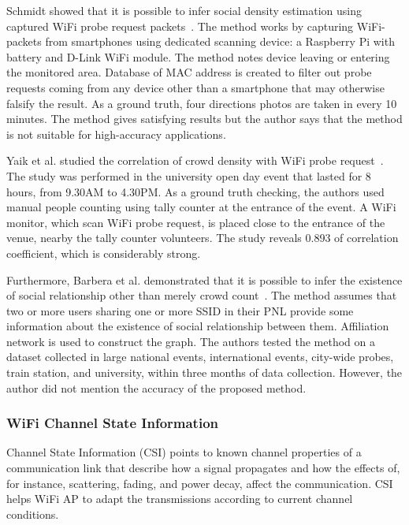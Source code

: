 	Schmidt showed that it is possible to infer social density estimation using captured WiFi probe request packets~\cite{thesis057}. The method works by capturing WiFi-packets from smartphones using dedicated scanning device: a Raspberry Pi with battery and D-Link WiFi module. The method notes device leaving or entering the monitored area. Database of \ac{MAC} address is created to filter out probe requests coming from any device other than a smartphone that may otherwise falsify the result. As a ground truth, four directions photos are taken in every 10 minutes. The method gives satisfying results but the author says that the method is not suitable for high-accuracy applications.
	
	Yaik et al. studied the correlation of crowd density with WiFi probe request~\cite{thesis047}. The study was performed in the university open day event that lasted for 8 hours, from 9.30AM to 4.30PM. As a ground truth checking, the authors used manual people counting using tally counter at the entrance of the event. A WiFi monitor, which scan WiFi probe request, is placed close to the entrance of the venue, nearby the tally counter volunteers. The study reveals 0.893 of correlation coefficient, which is considerably strong.

	Furthermore, Barbera et al. demonstrated that it is possible to infer the existence of social relationship other than merely crowd count~\cite{thesis014}. The method assumes that two or more users sharing one or more \ac{SSID} in their \ac{PNL} provide some information about the existence of social relationship between them. Affiliation network is used to construct the graph. The authors tested the method on a dataset collected in large national events, international events, city-wide probes, train station, and university, within three months of data collection. However, the author did not mention the accuracy of the proposed method.


	

	
	\subsubsection{WiFi Channel State Information} %
	\label{ssub:wifi_channel_state_information}
	Channel State Information (\ac{CSI}) points to known channel properties of a communication link that describe how a signal propagates and how the effects of, for instance, scattering, fading, and power decay, affect the communication. \ac{CSI} helps WiFi \ac{AP} to adapt the transmissions according to current channel conditions.

